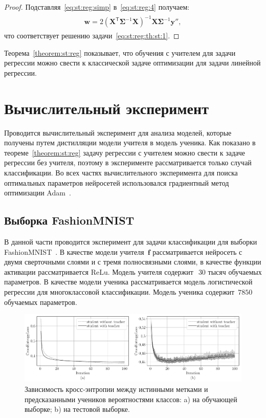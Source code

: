 \documentclass[12pt]{a&t}
\begin{document}
\begin{proof}
Подставляя~\eqref{eq:st:reg:simp} в~\eqref{eq:st:reg:4} получаем:
\begin{gather}
\label{eq:st:reg:5}
\begin{aligned}
\mathbf{w} = 2\left(\mathbf{X}^{\mathsf{T}}\bm{\Sigma}^{-1}\mathbf{X}\right)^{-1}\mathbf{X}\bm{\Sigma}^{-1}\mathbf{y''},
\end{aligned}
\end{gather}
что соответствует решению задачи~\eqref{eq:st:reg:th:st:1}.
\end{proof}

Теорема~\ref{theorem:st:reg} показывает, что обучения с учителем для задачи регрессии можно свести к классической задаче оптимизации для задачи линейной регрессии.

\section{Вычислительный эксперимент}
Проводится вычислительный эксперимент для анализа моделей, которые получены путем дистилляции модели учителя в модель ученика. Как показано в теореме~\ref{theorem:st:reg} задачу регрессии с учителем можно свести к задаче регрессии без учителя, поэтому в эксперименте рассматривается только случай классификации. Во всех частях вычислительного эксперимента для поиска оптимальных параметров нейросетей использовался градиентный метод оптимизации Adam~\cite{kingma2014}.
\subsection{Выборка FashionMNIST}
В данной части проводится эксперимент для задачи классификации для выборки FashionMNIST~\cite{fashionmnist}. В качестве модели учителя~$\mathbf{f}$ рассматривается нейросеть с двумя сверточными слоями и с тремя полносвязными слоями, в качестве функции активации рассматривается ReLu. Модель учителя содержит~$~30$ тысяч обучаемых параметров. В качестве модели ученика рассматривается модель логистической регрессии для многоклассовой классификации. Модель ученика содержит~$7850$ обучаемых параметров.

\begin{figure}[h!t]\center
\includegraphics[width=1\textwidth]{figures/mnist_loss}
\caption{Зависимость кросс-энтропии между истинными метками и предсказанными учеников вероятностями классов: a) на обучающей выборке; b) на тестовой выборке.}
\label{fg:ex:fashionmnist:loss}
\end{figure}
\end{document}

